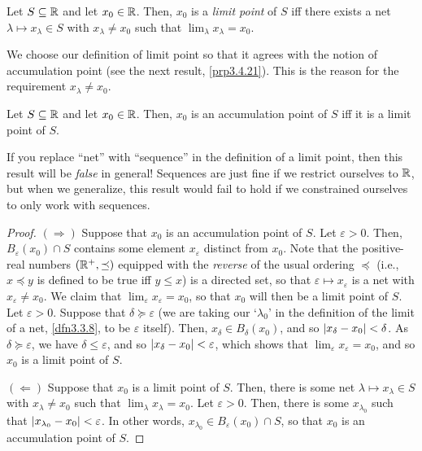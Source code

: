 \begin{dfn}
Let $S\subseteq \mathbb{R}$ and let $x_0\in \mathbb{R}$.  Then, $x_0$ is a \emph{limit point} of $S$ iff there exists a net $\lambda \mapsto x_\lambda \in S$ with $x_\lambda \neq x_0$ such that $\lim _\lambda x_\lambda =x_0$.
\begin{rmk}
We choose our definition of limit point so that it agrees with the notion of accumulation point (see the next result, \cref{prp3.4.21}).  This is the reason for the requirement $x_\lambda \neq x_0$.
\end{rmk}
\end{dfn}
\begin{prp}\label{prp3.4.21}
Let $S\subseteq \mathbb{R}$ and let $x_0\in \mathbb{R}$.  Then, $x_0$ is an accumulation point of $S$ iff it is a limit point of $S$.
\begin{rmk}
If you replace ``net'' with ``sequence'' in the definition of a limit point, then this result will be \emph{false} in general!  Sequences are just fine if we restrict ourselves to $\mathbb{R}$, but when we generalize, this result would fail to hold if we constrained ourselves to only work with sequences.
\end{rmk}
\begin{proof}
$(\Rightarrow )$ Suppose that $x_0$ is an accumulation point of $S$.  Let $\varepsilon >0$.  Then, $B_\varepsilon (x_0)\cap S$ contains some element $x_\varepsilon$ distinct from $x_0$.  Note that the positive-real numbers $(\mathbb{R} ^+,\preceq)$ equipped with the \emph{reverse} of the usual ordering $\preceq$ (i.e.,$x\preceq y$ is defined to be true iff $y\leq x$) is a directed set, so that $\varepsilon \mapsto x_\varepsilon$ is a net with $x_\varepsilon \neq x_0$.  We claim that $\lim _\varepsilon x_\varepsilon =x_0$, so that $x_0$ will then be a limit point of $S$.  Let $\varepsilon >0$.  Suppose that $\delta \succeq \varepsilon$ (we are taking our `$\lambda _0$' in the definition of the limit of a net, \cref{dfn3.3.8}, to be $\varepsilon$ itself).  Then, $x_\delta \in B_\delta (x_0)$, and so $\lvert x_\delta -x_0\rvert<\delta$.  As $\delta \succeq \varepsilon$, we have $\delta \leq \varepsilon$, and so $\lvert x_\delta -x_0\rvert<\varepsilon$, which shows that $\lim _\varepsilon x_\varepsilon =x_0$, and so $x_0$ is a limit point of $S$.

\blankline
\noindent
$(\Leftarrow )$ Suppose that $x_0$ is a limit point of $S$.  Then, there is some net $\lambda \mapsto x_\lambda \in S$ with $x_\lambda \neq x_0$ such that $\lim _\lambda x_\lambda =x_0$.  Let $\varepsilon >0$.  Then, there is some $x_{\lambda _0}$ such that $\lvert x_{\lambda _0}-x_0\rvert<\varepsilon$.  In other words, $x_{\lambda _0}\in B_\varepsilon (x_0)\cap S$, so that $x_0$ is an accumulation point of $S$.
\end{proof}
\end{prp}

